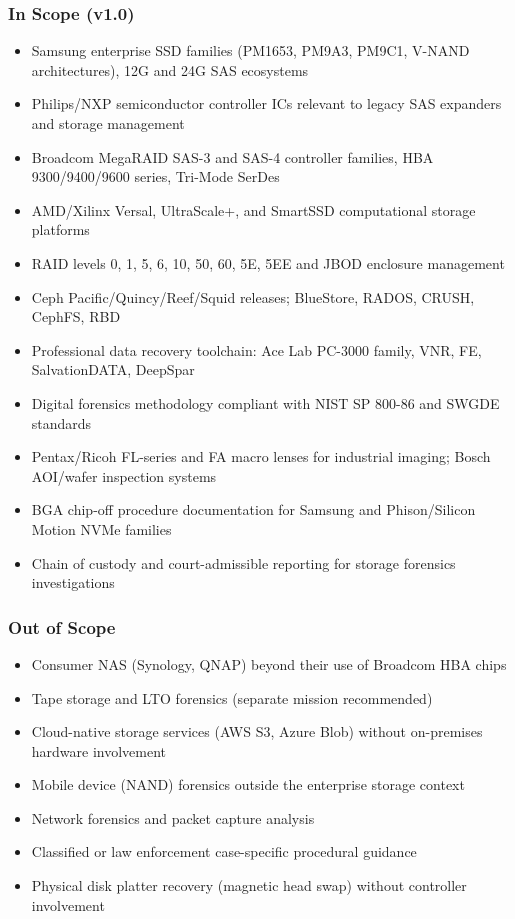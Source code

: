 \documentclass[11pt,letterpaper]{article}
\begin{document}
\subsubsection{In Scope (v1.0)}

\begin{itemize}[leftmargin=*]
  \item Samsung enterprise SSD families (PM1653, PM9A3, PM9C1, V-NAND architectures), 12G and 24G SAS ecosystems
  \item Philips/NXP semiconductor controller ICs relevant to legacy SAS expanders and storage management
  \item Broadcom MegaRAID SAS-3 and SAS-4 controller families, HBA 9300/9400/9600 series, Tri-Mode SerDes
  \item AMD/Xilinx Versal, UltraScale+, and SmartSSD computational storage platforms
  \item RAID levels 0, 1, 5, 6, 10, 50, 60, 5E, 5EE and JBOD enclosure management
  \item Ceph Pacific/Quincy/Reef/Squid releases; BlueStore, RADOS, CRUSH, CephFS, RBD
  \item Professional data recovery toolchain: Ace Lab PC-3000 family, VNR, FE, SalvationDATA, DeepSpar
  \item Digital forensics methodology compliant with NIST SP 800-86 and SWGDE standards
  \item Pentax/Ricoh FL-series and FA macro lenses for industrial imaging; Bosch AOI/wafer inspection systems
  \item BGA chip-off procedure documentation for Samsung and Phison/Silicon Motion NVMe families
  \item Chain of custody and court-admissible reporting for storage forensics investigations
\end{itemize}

\subsubsection{Out of Scope}

\begin{itemize}[leftmargin=*]
  \item Consumer NAS (Synology, QNAP) beyond their use of Broadcom HBA chips
  \item Tape storage and LTO forensics (separate mission recommended)
  \item Cloud-native storage services (AWS S3, Azure Blob) without on-premises hardware involvement
  \item Mobile device (NAND) forensics outside the enterprise storage context
  \item Network forensics and packet capture analysis
  \item Classified or law enforcement case-specific procedural guidance
  \item Physical disk platter recovery (magnetic head swap) without controller involvement
\end{itemize}
\end{document}
